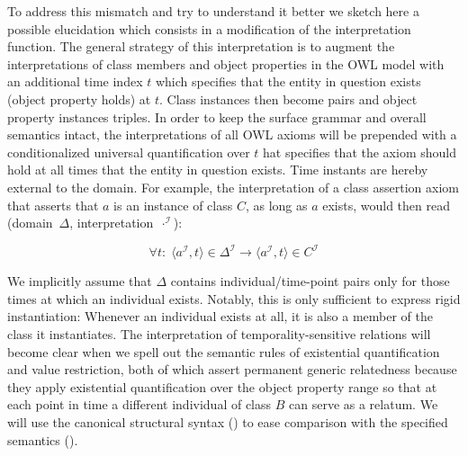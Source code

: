 \documentclass{ao2e}
\newcommand{\mclass}[1]{\ensuremath{\mathit{#1}}}
\newcommand{\dlint}[1]{\ensuremath{#1^{\mathcal{I}}}}
\newcommand{\pair}[2]{\ensuremath{\langle #1,#2\rangle}}
\begin{document}
To address this mismatch and try to understand it better we sketch here a
possible elucidation  which consists in a modification of the interpretation
function. The general strategy of this interpretation is to augment the
interpretations of class members and object properties in the OWL model with an
additional time index $t$ which specifies that the entity in question exists
(object property holds) at $t$. Class instances then become pairs and object
property instances triples. In order to keep the surface grammar and overall
semantics intact, the interpretations of all OWL axioms will be prepended with a
conditionalized universal quantification over $t$  hat specifies that the axiom
should hold at all times that the entity in question exists.  Time instants are
hereby external to the domain. For example, the interpretation of a class
assertion axiom that asserts that $a$ is an instance of class \mclass{C}, as long
as $a$ exists, would then read (domain~$\Delta$, interpretation~$\cdot^\mathcal{I}$):

\begin{equation}
\forall t:\;\pair{\dlint{a}}{t}\in \dlint{\Delta} \rightarrow
\pair{\dlint{a}}{t} \in \dlint{\mclass{C}}
\end{equation}

We implicitly assume that $\Delta$ contains individual/time-point pairs only for
those times at which an individual exists. Notably, this is only sufficient to express rigid instantiation: Whenever an individual exists at
all, it is also a member of the class it instantiates. The interpretation of
temporality-sensitive relations will become clear when we spell out the semantic
rules of existential quantification and value restriction, both of which assert
permanent generic relatedness because they apply existential quantification over the
object property range so that at each point in time a different individual of
class \mclass{B} can serve as a relatum. We will use the canonical structural syntax
(\cite{OWL2:structural})
to ease comparison with the specified semantics (\cite{OWL2:direct}).
\end{document}
